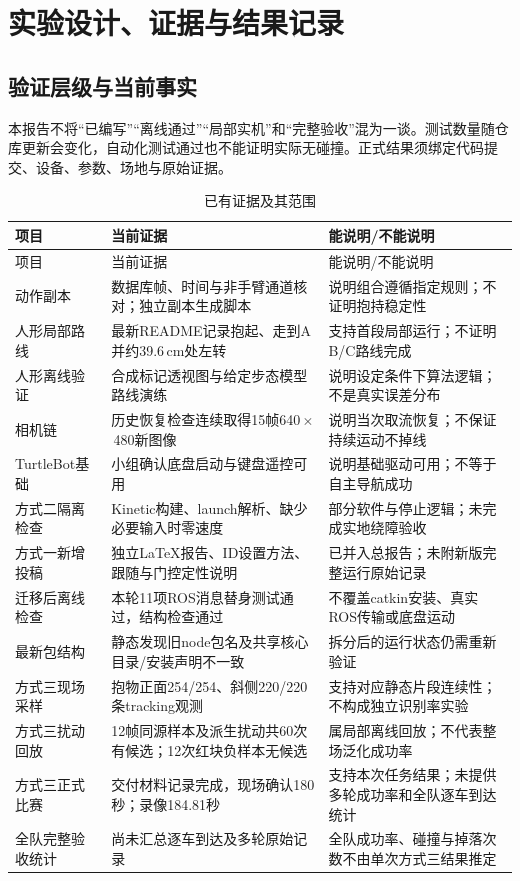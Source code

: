 \section{实验设计、证据与结果记录}\label{sec:experiments}
\subsection{验证层级与当前事实}
本报告不将“已编写”“离线通过”“局部实机”和“完整验收”混为一谈。测试数量随仓库更新会变化，自动化测试通过也不能证明实际无碰撞。正式结果须绑定代码提交、设备、参数、场地与原始证据。
\begin{longtable}{p{32mm}p{54mm}p{51mm}}
\caption{已有证据及其范围}\\\toprule
项目 & 当前证据 & 能说明/不能说明\\\midrule\endfirsthead
\toprule 项目 & 当前证据 & 能说明/不能说明\\\midrule\endhead
动作副本 & 数据库帧、时间与非手臂通道核对；独立副本生成脚本 & 说明组合遵循指定规则；不证明抱持稳定性\\
人形局部路线 & 最新README记录抱起、走到A并约39.6\,cm处左转 & 支持首段局部运行；不证明B/C路线完成\\
人形离线验证 & 合成标记透视图与给定步态模型路线演练 & 说明设定条件下算法逻辑；不是真实误差分布\\
相机链 & 历史恢复检查连续取得15帧640\,$\times$\,480新图像 & 说明当次取流恢复；不保证持续运动不掉线\\
TurtleBot基础 & 小组确认底盘启动与键盘遥控可用 & 说明基础驱动可用；不等于自主导航成功\\
方式二隔离检查 & Kinetic构建、launch解析、缺少必要输入时零速度 & 部分软件与停止逻辑；未完成实地绕障验收\\
方式一新增投稿 & 独立LaTeX报告、ID设置方法、跟随与门控定性说明 & 已并入总报告；未附新版完整运行原始记录\\
迁移后离线检查 & 本轮11项ROS消息替身测试通过，结构检查通过 & 不覆盖catkin安装、真实ROS传输或底盘运动\\
最新包结构 & 静态发现旧node包名及共享核心目录/安装声明不一致 & 拆分后的运行状态仍需重新验证\\
方式三现场采样 & 抱物正面254/254、斜侧220/220条tracking观测 & 支持对应静态片段连续性；不构成独立识别率实验\\
方式三扰动回放 & 12帧同源样本及派生扰动共60次有候选；12次红块负样本无候选 & 属局部离线回放；不代表整场泛化成功率\\
方式三正式比赛 & 交付材料记录完成，现场确认180秒；录像184.81秒 & 支持本次任务结果；未提供多轮成功率和全队逐车到达统计\\
全队完整验收统计 & 尚未汇总逐车到达及多轮原始记录 & 全队成功率、碰撞与掉落次数不由单次方式三结果推定\\\bottomrule

\end{longtable}
